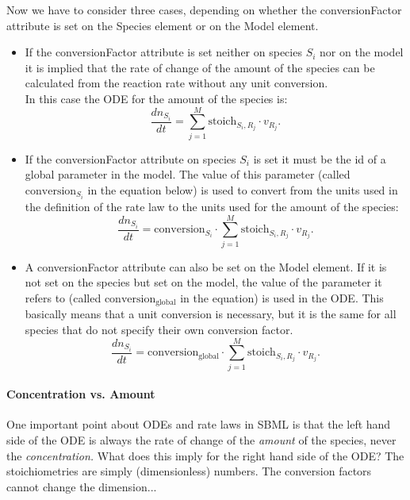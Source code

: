 Now we have to consider three cases, depending on whether the conversionFactor
attribute is set on the Species element or on the Model element.

\begin{itemize}
\item If the conversionFactor attribute is set neither on species $S_{i}$
nor on the model it is implied that the rate of change of the amount
of the species can be calculated from the reaction rate without any
unit conversion. \\
In this case the ODE for the amount of the species is:\[
\frac{dn_{S_{i}}}{dt}=\sum_{j=1}^{M}\textrm{stoich}_{S_{i},R_{j}}\cdot v_{R_{j}}.\]

\item If the conversionFactor attribute on species $S_{i}$ is set it must
be the id of a global parameter in the model. The value of this parameter
(called $\textrm{conversion}_{S_{i}}$ in the equation below) is used
to convert from the units used in the definition of the rate law to
the units used for the amount of the species: \[
\frac{dn_{S_{i}}}{dt}={\textstyle \textrm{conversion}_{S_{i}}}\cdot\sum_{j=1}^{M}\textrm{stoich}_{S_{i},R_{j}}\cdot v_{R_{j}}.\]

\item A conversionFactor attribute can also be set on the Model element.
If it is not set on the species but set on the model, the value of
the parameter it refers to (called $\textrm{conversion}_{\textrm{global}}$
in the equation) is used in the ODE. This basically means that a unit
conversion is necessary, but it is the same for all species that do
not specify their own conversion factor.\[
\frac{dn_{S_{i}}}{dt}={\textstyle \textrm{conversion}_{\textrm{global}}}\cdot\sum_{j=1}^{M}\textrm{stoich}_{S_{i},R_{j}}\cdot v_{R_{j}}.\]

\end{itemize}

\paragraph{Concentration vs. Amount}

One important point about ODEs and rate laws in SBML is that the left
hand side of the ODE is always the rate of change of the \emph{amount}
of the species, never the \emph{concentration.} What does this imply
for the right hand side of the ODE? The stoichiometries are simply
(dimensionless) numbers. The conversion factors cannot change the
dimension...

